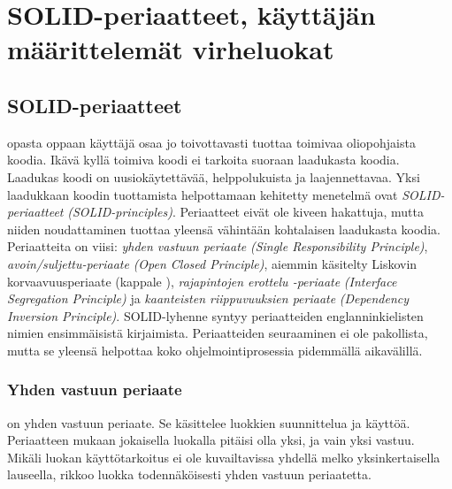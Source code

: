 \documentclass{tufte-book}
\newcommand{\eng}[1]{\textit{(#1)}}
\newcommand{\new}[1]{\textit{\gls{#1}}}
\newcommand{\neweng}[2]{\new{#1} \eng{#2}}
\begin{document}

\chapter{SOLID-periaatteet, käyttäjän määrittelemät virheluokat}
\label{solid+exceptions}


\section{SOLID-periaatteet}
\label{solid}

 opasta oppaan käyttäjä osaa jo toivottavasti tuottaa toimivaa
oliopohjaista koodia. Ikävä kyllä toimiva koodi ei tarkoita suoraan laadukasta koodia. Laadukas
koodi on uusiokäytettävää, helppolukuista ja laajennettavaa. Yksi laadukkaan koodin tuottamista
helpottamaan kehitetty menetelmä ovat \neweng{SOLID-periaatteet}{SOLID-principles}. Periaatteet
eivät ole kiveen hakattuja, mutta niiden noudattaminen tuottaa yleensä vähintään kohtalaisen
laadukasta koodia. Periaatteita on viisi: \neweng{yhden vastuun periaate}{Single Responsibility
Principle}, \neweng{avoin/suljettu-periaate}{Open Closed Principle}, aiemmin käsitelty
\gls{Liskovin korvaavuusperiaate} (kappale ), \neweng{rajapintojen erottelu
-periaate}{Interface Segregation Principle} ja \neweng{kaanteisten riippuvuuksien periaate}
{Dependency Inversion Principle}. SOLID-lyhenne syntyy periaatteiden englanninkielisten nimien
ensimmäisistä kirjaimista. Periaatteiden seuraaminen ei ole pakollista, mutta se yleensä helpottaa
koko ohjelmointiprosessia pidemmällä aikavälillä.

\subsection{Yhden vastuun periaate}
\label{SRP}

 on \gls{yhden vastuun periaate}. Se käsittelee luokkien
suunnittelua ja käyttöä. Periaatteen mukaan jokaisella luokalla pitäisi olla yksi, ja vain yksi
vastuu. Mikäli luokan käyttötarkoitus ei ole kuvailtavissa yhdellä melko yksinkertaisella
lauseella, rikkoo luokka todennäköisesti yhden vastuun periaatetta.
\end{document}
